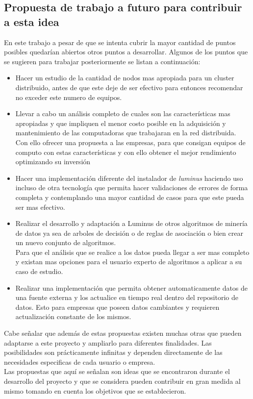 \subsection{Propuesta de trabajo a futuro para contribuir a esta idea}
En este trabajo a pesar de que se intenta cubrir la mayor cantidad de puntos posibles quedarían abiertos otros puntos a desarrollar. Algunos de los puntos que se sugieren para trabajar posteriormente se listan a continuación:
\begin{itemize}
	\item Hacer un estudio de la cantidad de nodos mas apropiada para un cluster distribuido, antes de que este deje de ser efectivo para entonces recomendar no exceder este numero de equipos.
	\\
	\item Llevar a cabo un análisis completo de cuales son las características mas apropiadas y que impliquen el menor costo posible en la adquisición y mantenimiento de las computadoras que trabajaran en la red distribuida.
	\\
	Con ello ofrecer una propuesta a las empresas, para que consigan equipos de computo con estas características y con ello obtener el mejor rendimiento optimizando su inversión
	\item Hacer una implementación diferente del instalador de \emph{luminus} haciendo uso incluso de otra tecnología que permita hacer validaciones de errores de forma completa y contemplando una mayor cantidad de casos para que este pueda ser mas efectivo.
	\item Realizar el desarrollo y adaptación a Luminus de otros algoritmos de minería de datos ya sea de arboles de decisión o de reglas de asociación o bien crear un nuevo conjunto de algoritmos. 
	\\
	Para que el análisis que se realice a los datos pueda llegar a ser mas completo y existan mas opciones para el usuario experto de algoritmos a aplicar a su caso de estudio.
	\item Realizar una implementación que permita obtener automaticamente datos de una fuente externa y los actualice en tiempo real dentro del repositorio de datos. Esto para empresas que poseen datos cambiantes y requieren actualización constante de los mismos.    
\end{itemize}   
Cabe señalar que además de estas propuestas existen muchas otras que pueden adaptarse a este proyecto y ampliarlo para diferentes finalidades. Las posibilidades son prácticamente infinitas y dependen directamente de las necesidades especificas de cada usuario o empresa. 
\\
Las propuestas que aquí se señalan son ideas que se encontraron durante el desarrollo del proyecto y que se considera pueden contribuir en gran medida al mismo tomando en cuenta los objetivos que se establecieron.
